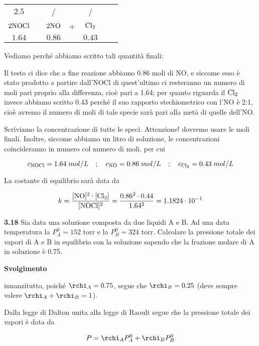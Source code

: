 \begin{center}
    \begin{tabular}{ccccccc}
        $2.5$ & & / & & /\\
        $\rm 2NOCl$ & \ce{<-->} & $\rm 2NO$ & + & $\rm Cl_2$\\
        $1.64$ & & $0.86$ & & $0.43$\\
    \end{tabular}
\end{center}

Vediamo perché abbiamo scritto tali quantità finali:

Il testo ci dice che a fine reazione abbiamo 0.86 moli di NO, e siccome esso è stato prodotto a partire dall'NOCl di quest'ultimo ci resteranno un numero di moli pari proprio alla differenza, cioè pari a 1.64; per quanto riguarda il $\rm Cl_2$ invece abbiamo scritto 0.43 perché il suo rapporto stechiometrico con l'NO è 2:1, cioè avremo il numero di moli di tale specie sarà pari alla metà di quelle dell'NO.

Scriviamo la concentrazione di tutte le speci. Attenzione! dovremo usare le moli finali. Inoltre, siccome abbiamo un litro di soluzione, le concentrazioni coincideranno in numero col numero di moli, per cui

$$c_{\rm NOCl}=1.64\;mol/L
\quad;\quad
c_{\rm NO}=0.86\;mol/L
\quad;\quad
c_{\rm Cl_2}=0.43\;mol/L$$

La costante di equilibrio sarà data da

$$k=\rm \frac{[NO]^2 \cdot [Cl_2]}{[NOCl]^2}
=\frac{0.86^2 \cdot 0.44}{1.64^2}=1.1824 \cdot 10^{-1}$$

\vspace{0.2cm}\textbf{3.18} Sia data una soluzione composta da due liquidi A e B. Ad una data temperatura la $P^0_A = 152$ torr
e la $P^0_B = 324$ torr. Calcolare la pressione totale dei vapori di A e B in equilibrio con la soluzione sapendo che la frazione molare di A in soluzione è 0.75.

\vspace{0.2cm}\large\textbf{Svolgimento}\normalsize

\vspace{0.2cm}innanzitutto, poiché $\rchi_A=0.75$, segue che $\rchi_B=0.25$ (deve sempre valere $\rchi_A + \rchi_B =1$).

Dalla legge di Dalton unita alla legge di Raoult segue che la pressione totale dei vapori è data da

$$P=\rchi_A P_A^0 + \rchi_B P_B^0$$

